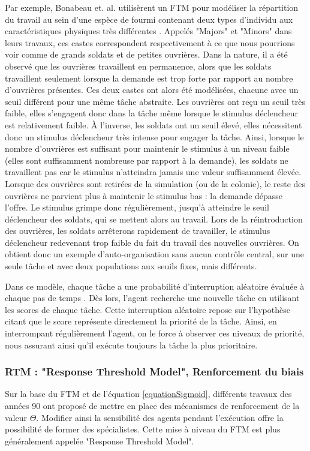         Par exemple, Bonabeau et. al. \cite{bonabeau_quantitative_1996} utilisèrent un FTM pour modéliser la répartition du travail au sein d'une espèce de fourmi contenant deux types d'individu aux caractéristiques physiques très différentes \cite{wilson_relation_1984}. Appelés "Majors" et "Minors" dans leurs travaux, ces castes correspondent respectivement à ce que nous pourrions voir comme de grands soldats et de petites ouvrières. Dans la nature, il a été observé que les ouvrières travaillent en permanence, alors que les soldats travaillent seulement lorsque la demande est trop forte par rapport au nombre d'ouvrières présentes. Ces deux castes ont alors été modélisées, chacune avec un seuil différent pour une même tâche abstraite. 
        Les ouvrières ont reçu un seuil très faible, elles s'engagent donc dans la tâche même lorsque le stimulus déclencheur est relativement faible. À l'inverse, les soldats ont un seuil élevé, elles nécessitent donc un stimulus déclencheur très intense pour engager la tâche. Ainsi, lorsque le nombre d'ouvrières est suffisant pour maintenir le stimulus à un niveau faible (elles sont suffisamment nombreuse par rapport à la demande), les soldats ne travaillent pas car le stimulus n'atteindra jamais une valeur suffisamment élevée. Lorsque des ouvrières sont retirées de la simulation (ou de la colonie), le reste des ouvrières ne parvient plus à maintenir le stimulus bas : la demande dépasse l'offre. Le stimulus grimpe donc régulièrement, jusqu'à atteindre le seuil déclencheur des soldats, qui se mettent alors au travail. Lors de la réintroduction des ouvrières, les soldats arrêterons rapidement de travailler, le stimulus déclencheur redevenant trop faible du fait du travail des nouvelles ouvrières. On obtient donc un exemple d'auto-organisation sans aucun contrôle central, sur une seule tâche et avec deux populations aux seuils fixes, mais différents.
		
		Dans ce modèle, chaque tâche a une probabilité d'interruption aléatoire évaluée à chaque pas de temps \cite{gautrais_emergent_2002}. Dès lors, l'agent recherche une nouvelle tâche en utilisant les scores de chaque tâche. Cette interruption aléatoire repose sur l'hypothèse citant que le score représente directement la priorité de la tâche. Ainsi, en interrompant régulièrement l'agent, on le force à observer ces niveaux de priorité, nous assurant ainsi qu'il exécute toujours la tâche la plus prioritaire.
        
        \subsubsection{RTM : "Response Threshold Model", Renforcement du biais}
        Sur la base du FTM et de l'équation \ref{equationSigmoid}, différents travaux des années 90 \cite{theraulaz_response_1998,carbonell_multi-agent_1994, gautrais_emergent_2002} ont proposé de mettre en place des mécanismes de renforcement de la valeur $\Theta$. Modifier ainsi la sensibilité des agents pendant l'exécution offre la possibilité de former des spécialistes. Cette mise à niveau du FTM est plus généralement appelée "Response Threshold Model".
        
